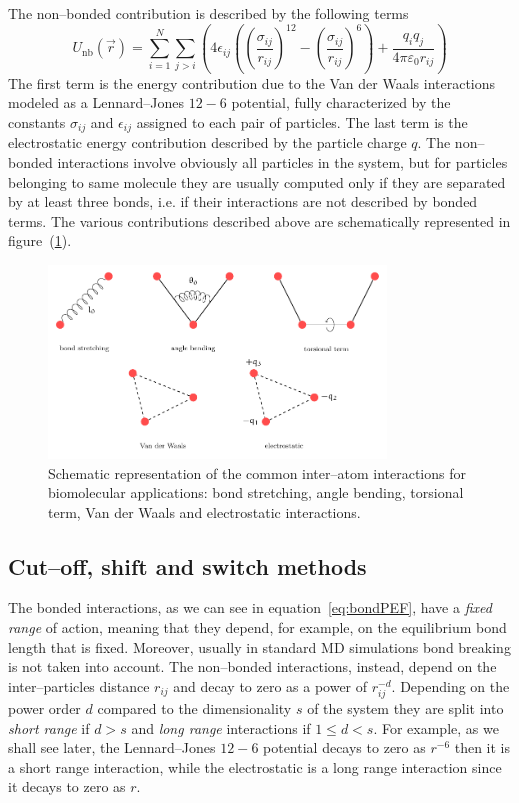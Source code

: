 The non--bonded contribution is described by the following terms
\begin{equation}
	U_\text{nb}(\vec r) = \sum_{i=1}^N \sum_{j>i} \left ( {4\epsilon_{ij} \left ( \left ( \frac{\sigma_{ij}}{r_{ij}} \right )^{12} - \left ( \frac{\sigma_{ij}}{r_{ij}} \right )^6 \right )  + \frac{q_iq_j}{4\pi\varepsilon_0 r_{ij}}} \right )
	\label{eq:nonbonPEF}
\end{equation}
The first term is the energy contribution due to the Van der Waals interactions modeled as a Lennard--Jones
$12-6$ potential, fully characterized by the constants $\sigma_{ij}$ and $\epsilon_{ij}$ assigned to each
pair of particles. The last term is the electrostatic energy contribution described by the particle charge $q$. 
The non--bonded interactions involve obviously all particles in the system, but for particles belonging to same
molecule they are usually computed only if they are separated by at least three bonds, i.e. if their 
interactions are not described by bonded terms. The various contributions described above are schematically 
represented in figure~(\ref{fig:FFInteraction}).
\begin{figure}[!ht]
	\centering
	\includegraphics[width=0.8\textwidth]{./img/interPartInt/interPartInt}
	\caption{Schematic representation of the common inter--atom interactions for biomolecular applications: bond stretching, angle bending, torsional term, Van der Waals and electrostatic interactions.}%
	\label{fig:FFInteraction}
\end{figure}

\subsection{Cut--off, shift and switch methods}
The bonded interactions, as we can see in equation~\eqref{eq:bondPEF}, have a \textit{fixed range} of action, 
meaning that they depend, for example, on the equilibrium bond length that is fixed. Moreover, usually in 
standard \ac{MD} simulations bond breaking is not taken into account. The non--bonded interactions, instead, 
depend on the inter--particles distance $r_{ij}$ and decay to zero as a power of $r_{ij}^{-d}$. Depending on the 
power order $d$ compared to the dimensionality $s$ of the system they are split into \textit{short range} if 
$d>s$ and \textit{long range} interactions if $1 \le d < s$. For example, as we shall see later, the 
Lennard--Jones $12-6$ potential decays to zero as $r^{-6}$ then it is a short range interaction, while the 
electrostatic is a long range interaction since it decays to zero as $r$.

